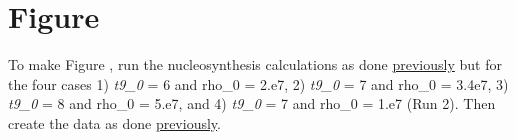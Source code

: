 \section*{Figure }
\hypertarget{sec:ec_time_multi}{}


\noindent To make Figure ,
run the nucleosynthesis calculations as done
\hyperlink{sec:single_zone}{previously} but for the four cases
1) {\em t9\_0} = 6 and {\rm rho\_0 = 2.e7},
2) {\em t9\_0} = 7 and {\rm rho\_0 = 3.4e7},
3) {\em t9\_0} = 8 and {\rm rho\_0 = 5.e7}, and
4) {\em t9\_0} = 7 and {\rm rho\_0 = 1.e7} (Run 2).
Then create the data as done
\hyperlink{sec:ec_time5}{previously}.

\addtocounter{counter}{1}

